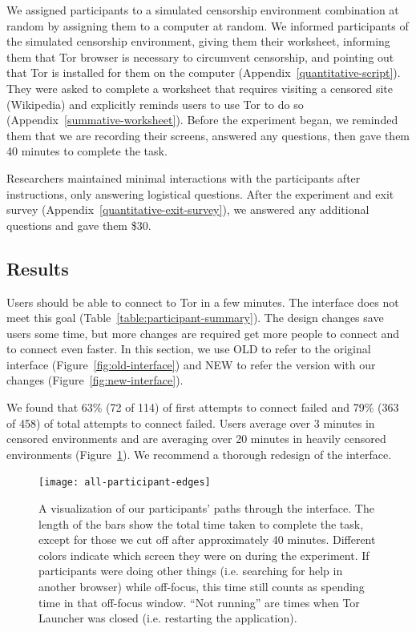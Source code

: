 \documentclass[USenglish,oneside,twocolumn]{article}
\begin{document}
We assigned participants  to a simulated censorship environment combination at random by assigning them to a computer at random. We informed participants of the simulated censorship environment, giving them their worksheet,  informing them that Tor browser is necessary to circumvent censorship, and pointing out that Tor is installed for them on the computer (Appendix~\ref{quantitative-script}). They were asked to complete a worksheet that requires visiting a censored site (Wikipedia) and explicitly reminds users to use Tor to do so (Appendix~\ref{summative-worksheet}). Before the experiment began, we reminded them that we are recording their screens, answered any questions, then gave them 40 minutes to complete the task. 

Researchers maintained minimal interactions with the participants after instructions, only answering logistical questions. After the experiment and exit survey (Appendix~\ref{quantitative-exit-survey}), we answered any additional questions and gave them \$30. 

\subsection{Results} 
Users should be able to connect to Tor in a few minutes. The interface does not meet this goal (Table~\ref{table:participant-summary}). The design changes save users some time, but more changes are required get more people to connect and to connect even faster. In this section, we use OLD to refer to the original interface (Figure~\ref{fig:old-interface}) and NEW to refer the version with our changes (Figure~\ref{fig:new-interface}).

We found that 63\% (72 of 114) of first attempts to connect failed and 79\% (363 of 458) of total attempts to connect failed. Users average over 3 minutes in censored environments and are averaging over 20 minutes in heavily censored environments (Figure~\ref{fig:all-participant-edges}). We recommend a thorough redesign of the interface.

\label{all-participant-edges} 
\begin{figure}
\centering
\texttt{[image: all-participant-edges]}
\caption{
A visualization of our participants' paths through the interface.
The length of the bars show the total time taken to complete the task,
except for those we cut off after approximately 40 minutes.
Different colors indicate which screen they were on during the experiment.
If participants were doing other things (i.e. searching for help in another browser)
while off-focus, this time still counts as spending time in that off-focus window. 
``Not running'' are times when Tor Launcher was closed (i.e. restarting the application).}
\label{fig:all-participant-edges}
\end{figure}
\end{document}
